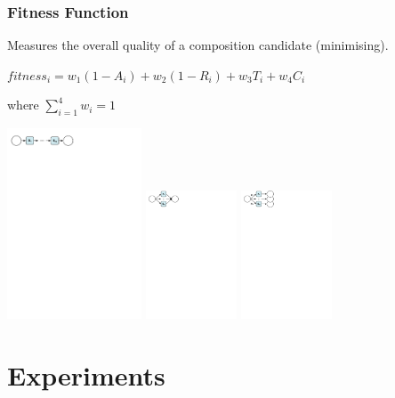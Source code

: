 \documentclass[xcolor={table}]{beamer}
\begin{document}

\begin{frame}
\frametitle{Fitness Function}
Measures the overall quality of a composition candidate (minimising).

\vfill

\centerline{
$fitness_i = w_1(1 - A_i) + w_2(1 - R_i) + w_3T_i + w_4C_i$
}
\bigskip

\centerline{
\noindent where $\sum_{i=1}^{4} w_i = 1$
}


\vfill
\includegraphics[width=4cm]{sequence.pdf}
\hfill
\includegraphics[width=2.7cm]{parallel.pdf}
\hfill
\includegraphics[width=2.7cm]{conditional.pdf}

\end{frame}

\section{Experiments}
\subsection{}
\end{document}
